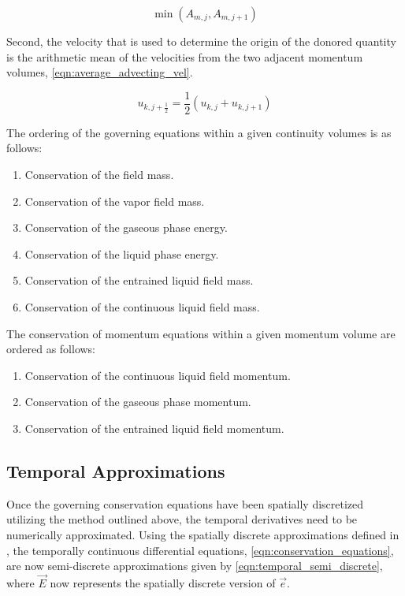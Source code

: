 \begin{equation}
\label{eqn:area_def}
\min\left(A_{m,j}, A_{m,j+1}\right)
\end{equation}

Second, the velocity that is used to determine the origin of the donored quantity is the arithmetic mean of the velocities from the two adjacent momentum volumes, \eqref{eqn:average_advecting_vel}.

\begin{equation}
\label{eqn:average_advecting_vel}
u_{k,j+\frac{1}{2}} = \frac{1}{2}\left(u_{k,j} + u_{k, j+1}\right)
\end{equation}

The ordering of the governing equations within a given continuity volumes is as follows:

\begin{enumerate}
\item{Conservation of the \ncg{} field mass.}
\item{Conservation of the vapor field mass.}
\item{Conservation of the gaseous phase energy.}
\item{Conservation of the liquid phase energy.}
\item{Conservation of the entrained liquid field mass.}
\item{Conservation of the continuous liquid field mass.}
\end{enumerate}

The conservation of momentum equations within a given momentum volume are ordered as follows:

\begin{enumerate}
\item{Conservation of the continuous liquid field momentum.}
\item{Conservation of the gaseous phase momentum.}
\item{Conservation of the entrained liquid field momentum.}
\end{enumerate}

\subsection{Temporal Approximations}
\label{subsect:temporal_approx}

Once the governing conservation equations have been spatially discretized utilizing the method outlined above, the temporal derivatives need to be numerically approximated.
Using the spatially discrete approximations defined in , the temporally continuous differential equations, \eqref{eqn:conservation_equations}, are now semi-discrete approximations given by \eqref{eqn:temporal_semi_discrete}, where $\vec{E}$ now represents the spatially discrete version of $\vec{e}$.

